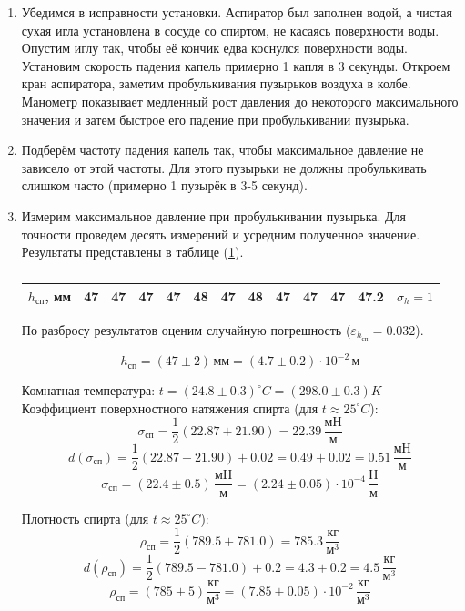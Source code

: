 \documentclass[a4paper,12pt]{article} %
\begin{document}
\begin{enumerate}
  \item Убедимся в исправности установки. Аспиратор был заполнен водой, а чистая сухая игла установлена в сосуде со спиртом, не касаясь поверхности воды. Опустим иглу так, чтобы её кончик едва коснулся поверхности воды. Установим скорость падения капель примерно 1 капля в 3 секунды. Откроем кран аспиратора, заметим пробулькивания пузырьков воздуха в колбе. Манометр показывает медленный рост давления до некоторого максимального значения и затем быстрое его падение при пробулькивании пузырька.
  
  \item Подберём частоту падения капель так, чтобы максимальное давление не зависело от этой частоты. Для этого пузырьки не должны пробулькивать слишком часто (примерно 1 пузырёк в 3-5 секунд).
  
  \item Измерим максимальное давление при пробулькивании пузырька. Для точности проведем десять измерений и усредним полученное значение. Результаты представлены в таблице (\ref{tab:alcohol}).
  
  \begin{table}[h!]
    \centering
    \begin{tabular}{|c|cccccccccc|c|c|}
      \hline
      $h_\text{сп}$, мм & 47 & 47 & 47 & 47 & 48 & 47 & 48 & 47 & 47 & 47 & 47.2 & $\sigma_h = 1$ \\
      \hline
    \end{tabular}
    \caption{}
    \label{tab:alcohol}
  \end{table}
  
  По разбросу результатов оценим случайную погрешность ($\varepsilon_{h_\text{сп}} = 0.032$).

  \[
    h_\text{сп} = (47 \pm 2) \, \text{мм} = (4.7 \pm 0.2) \cdot 10^{-2} \, \text{м}
  \]

  Комнатная температура: $t = (24.8 \pm 0.3)^{\circ} C = (298.0 \pm 0.3) K $ \\
  Коэффициент поверхностного натяжения спирта (для $t \approx 25^{\circ}C$): 
  \[
    \sigma_\text{сп} = \frac{1}{2} (22.87 + 21.90) = 22.39 \, \frac{\text{мН}}{\text{м}}
  \] 
  \[ 
    d(\sigma_\text{сп}) = \frac{1}{2} (22.87 - 21.90) + 0.02 = 0.49 + 0.02 = 0.51 \, \frac{\text{мН}}{\text{м}}
  \]
  \[
    \sigma_\text{сп} = (22.4 \pm 0.5) \, \frac{\text{мН}}{\text{м}} = (2.24 \pm 0.05) \cdot 10^{-4} \, \frac{\text{Н}}{\text{м}}
  \]
  
  Плотность спирта (для $t \approx 25^{\circ}C$):  
  \[
    \rho_\text{сп} = \frac{1}{2} (789.5 + 781.0) = 785.3 \, \frac{\text{кг}}{\text{м}^3}
  \] 
  \[ 
    d(\rho_\text{сп}) = \frac{1}{2} (789.5 - 781.0) + 0.2 = 4.3 + 0.2 = 4.5 \, \frac{\text{кг}}{\text{м}^3}
  \]
  \[
    \rho_\text{сп} = (785 \pm 5) \frac{\text{кг}}{\text{м}^3} = (7.85 \pm 0.05) \cdot 10^{-2} \, \frac{\text{кг}}{\text{м}^3}
  \]
  

\end{enumerate}
\end{document}
